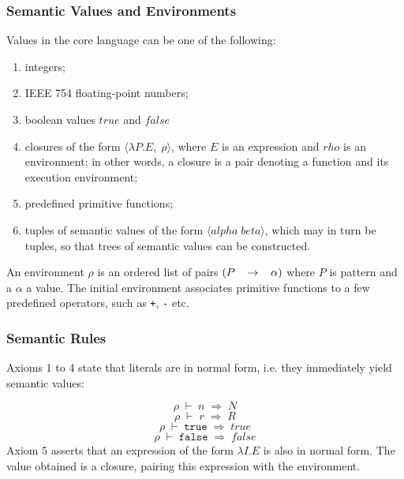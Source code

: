 \documentclass[10pt]{article}
\begin{document}
\subsubsection*{Semantic Values and Environments}
Values in the core language can be one of the following: \begin{enumerate}
\item integers;
\item IEEE 754 floating-point numbers;
\item boolean values $true$ and $false$
\item closures of the form $\langle{}\lambda{}P.E,\;\rho{}\rangle{}$, where $E$ is an expression and $rho$ is an environment; in other words, a closure is a pair denoting a function and its execution environment; 
\item predefined primitive functions;
\item tuples of semantic values of the form $\langle{}alpha\;beta\rangle{}$, which may in turn be tuples, so that trees of semantic values can be constructed. 
\end{enumerate}


An environment $\rho{}$ is an ordered list of pairs ${\mathrm\mathbf{}(}P\;\;\;\rightarrow{}\;\;\;\alpha{}{\mathrm\mathbf{})}$ where $P$ is pattern and a $\alpha{}$ a value. The initial
environment associates primitive functions to a few predefined
operators, such as \texttt{+}, \texttt{-} etc. 

\subsubsection*{Semantic Rules}
Axioms 1 to 4 state that literals are in normal form, i.e. they immediately yield semantic values: 

\begin{equation}
\rho{}\;\vdash{}\;n\;\Rightarrow{}\;N\end{equation}
\begin{equation}
\rho{}\;\vdash{}\;r\;\Rightarrow{}\;R\end{equation}
\begin{equation}
\rho{}\;\vdash{}\;\texttt{true}\;\Rightarrow{}\;true\end{equation}
\begin{equation}
\rho{}\;\vdash{}\;\texttt{false}\;\Rightarrow{}\;false\end{equation}
Axiom 5 asserts that an expression of the form $\lambda{}I.E$ is also in normal form. The
value obtained is a closure, pairing this expression with the
environment. 
\end{document}
